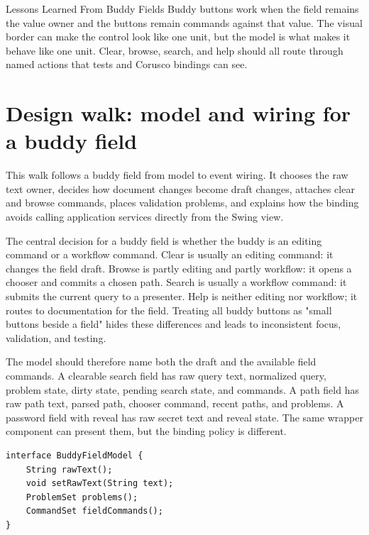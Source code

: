 \begin{principlebox}{Lessons Learned From Buddy Fields}
Buddy buttons work when the field remains the value owner and the buttons remain
commands against that value. The visual border can make the control look like one
unit, but the model is what makes it behave like one unit. Clear, browse, search,
and help should all route through named actions that tests and Corusco bindings
can see.
\end{principlebox}

\section{Design walk: model and wiring for a buddy field}

\begin{roadmapbox}
This walk follows a buddy field from model to event wiring. It chooses the raw
text owner, decides how document changes become draft changes, attaches clear
and browse commands, places validation problems, and explains how the binding
avoids calling application services directly from the Swing view.
\end{roadmapbox}

The central decision for a buddy field is whether the buddy is an editing command or a
workflow command. Clear is usually an editing command: it changes the field draft.
Browse is partly editing and partly workflow: it opens a chooser and commits a chosen
path. Search is usually a workflow command: it submits the current query to a presenter.
Help is neither editing nor workflow; it routes to documentation for the field. Treating
all buddy buttons as "small buttons beside a field" hides these differences and leads to
inconsistent focus, validation, and testing.

The model should therefore name both the draft and the available field commands. A
clearable search field has raw query text, normalized query, problem state, dirty state,
pending search state, and commands. A path field has raw path text, parsed path, chooser
command, recent paths, and problems. A password field with reveal has raw secret text
and reveal state. The same wrapper component can present them, but the binding policy is
different.

\begin{lstlisting}[caption={A buddy field model names draft and field commands.}]
interface BuddyFieldModel {
    String rawText();
    void setRawText(String text);
    ProblemSet problems();
    CommandSet fieldCommands();
}
\end{lstlisting}

